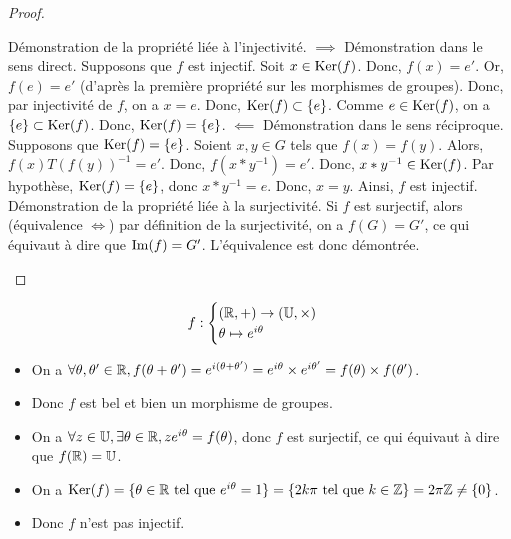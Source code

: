 \documentclass[12pt, a4paper]{report}
\begin{document}
\begin{proof}
    \begin{outline}[enumerate]
        \1 Démonstration de la propriété liée à l'injectivité.
            \2 $\implies$ Démonstration dans le sens direct.
                \3 Supposons que $f$ est injectif.
                \3 Soit $x \in \mathrm{Ker}(f)$. Donc, $f(x) = e'$.
                \3 Or, $f(e) = e'$ (d'après la première propriété sur les morphismes de groupes).
                \3 Donc, par injectivité de $f$, on a $x = e$.
                \3 Donc, $\mathrm{Ker}(f) \subset \{e\}$.
                \3 Comme $e \in \mathrm{Ker}(f)$, on a $\{e\} \subset \mathrm{Ker}(f)$.
                \3 Donc, $\mathrm{Ker}(f) = \{e\}$.
            \2 $\impliedby$ Démonstration dans le sens réciproque.
                \3 Supposons que $\mathrm{Ker}(f) = \{e\}$.
                \3 Soient $x,y \in G$ tels que $f(x) = f(y)$.
                \3 Alors, $f(x) T (f(y))^{-1} = e'$.
                \3 Donc, $f(x * y^{-1}) = e'$.
                \3 Donc, $x * y^{-1} \in \mathrm{Ker}(f)$.
                \3 Par hypothèse, $\mathrm{Ker}(f) = \{e\}$, donc $x * y^{-1} = e$.
                \3 Donc, $x = y$.
                \3 Ainsi, $f$ est injectif.
        \1 Démonstration de la propriété liée à la surjectivité.
            \2 Si $f$ est surjectif, alors (équivalence $\iff$) par définition de la surjectivité, on a $f(G) = G'$, ce qui équivaut à dire que $\mathrm{Im}(f) = G'$. L'équivalence est donc démontrée.
    \end{outline}
\end{proof}

\begin{example}
    $$f:\begin{cases}
    (\mathbb{R},+)\to(\mathbb{U},\times)\\
    \theta \mapsto e^{i\theta}
    \end{cases}$$

    \begin{itemize}
        \item On a $\forall \theta,\theta' \in \mathbb{R}, f(\theta + \theta') = e^{i(\theta + \theta')} = e^{i\theta} \times e^{i\theta'} = f(\theta) \times f(\theta')$.

        \item Donc $f$ est bel et bien un morphisme de groupes.

        \item On a $\forall z \in \mathbb{U}, \exists \theta \in \mathbb{R}, z e^{i\theta}=f(\theta)$, donc $f$ est surjectif, ce qui équivaut à dire que $f(\mathbb{R})=\mathbb{U}$.

        \item On a $\mathrm{Ker}(f) = \{\theta \in \mathbb{R} \text{ tel que } e^{i\theta} = 1\} = \{2k\pi \text{ tel que } k \in \mathbb{Z}\}=2\pi\mathbb{Z}\ne\{0\}$.

        \item Donc $f$ n'est pas injectif.
    \end{itemize}
\end{example}
\end{document}
